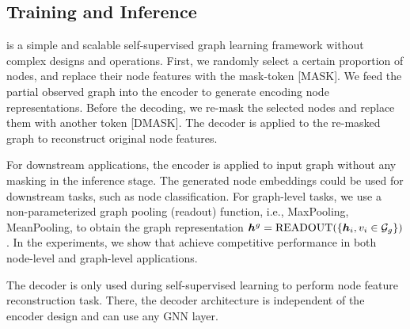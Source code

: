 {\subsection{Training and Inference}
\model is a simple and scalable self-supervised graph learning framework without complex designs and operations.
First, we randomly select a certain proportion of nodes, and replace their node features with the mask-token [MASK]. We feed the partial observed graph into the encoder to generate encoding node representations. Before the decoding, we re-mask the selected nodes and replace them with another token [DMASK]. The decoder is applied to the re-masked graph to reconstruct original node features.

For downstream applications, the encoder is applied to input graph without any masking in the inference stage. The generated node embeddings could be used for downstream tasks, such as node classification. For graph-level tasks, we use a non-parameterized graph pooling (readout) function, i.e., MaxPooling, MeanPooling, to obtain the graph representation
$ {\bm{h}}^g = \mathrm{READOUT}(\{{\bm{h}}_i, v_i \in \mathcal{G}_g \}) $.
In the experiments, we show that \model achieve competitive performance in both node-level and graph-level applications. 

The decoder is only used during self-supervised learning to perform node feature reconstruction task. There, the decoder architecture is independent of the encoder design and can use any GNN layer. 




}%